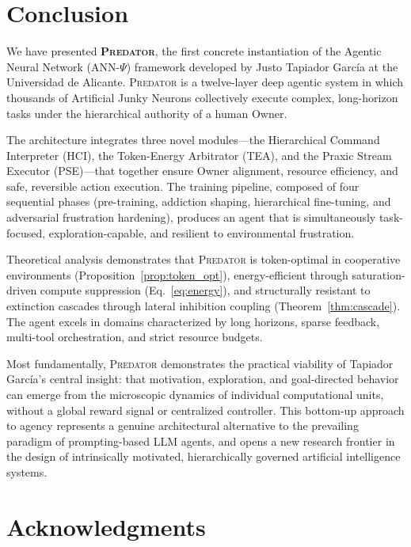 \documentclass[12pt,a4paper]{article}
\newcommand{\PREDATOR}{\textsc{Predator}}
\begin{document}
\section{Conclusion}
\label{sec:conclusion}

We have presented \textbf{\PREDATOR}, the first concrete instantiation of the
Agentic Neural Network (ANN-$\Psi$) framework developed by Justo Tapiador
Garc\'ia at the Universidad de Alicante. \PREDATOR{} is a twelve-layer deep
agentic system in which thousands of Artificial Junky Neurons collectively
execute complex, long-horizon tasks under the hierarchical authority of a
human Owner.

The architecture integrates three novel modules---the Hierarchical Command
Interpreter (HCI), the Token-Energy Arbitrator (TEA), and the Praxic Stream
Executor (PSE)---that together ensure Owner alignment, resource efficiency,
and safe, reversible action execution. The training pipeline, composed of
four sequential phases (pre-training, addiction shaping, hierarchical
fine-tuning, and adversarial frustration hardening), produces an agent that
is simultaneously task-focused, exploration-capable, and resilient to
environmental frustration.

Theoretical analysis demonstrates that \PREDATOR{} is token-optimal in
cooperative environments (Proposition~\ref{prop:token_opt}), energy-efficient
through saturation-driven compute suppression (Eq.~\ref{eq:energy}), and
structurally resistant to extinction cascades through lateral inhibition
coupling (Theorem~\ref{thm:cascade}). The agent excels in domains
characterized by long horizons, sparse feedback, multi-tool orchestration,
and strict resource budgets.

Most fundamentally, \PREDATOR{} demonstrates the practical viability of
Tapiador Garc\'ia's central insight: that motivation, exploration, and
goal-directed behavior can emerge from the microscopic dynamics of individual
computational units, without a global reward signal or centralized
controller. This bottom-up approach to agency represents a genuine
architectural alternative to the prevailing paradigm of prompting-based
LLM agents, and opens a new research frontier in the design of intrinsically
motivated, hierarchically governed artificial intelligence systems.

\section*{Acknowledgments}
\end{document}
